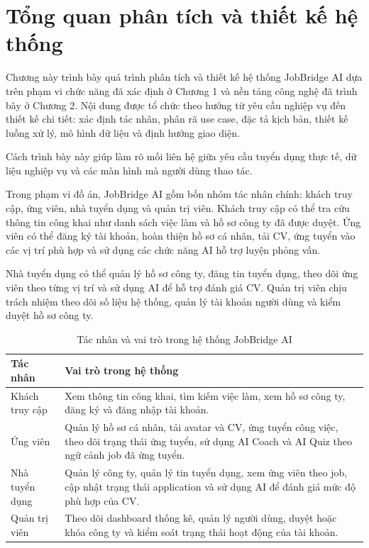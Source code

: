 \documentclass[../DoAn.tex]{subfiles}
\begin{document}
\label{chapter:3}

\section{Tổng quan phân tích và thiết kế hệ thống}

Chương này trình bày quá trình phân tích và thiết kế hệ thống JobBridge AI dựa trên phạm vi chức năng đã xác định ở Chương 1 và nền tảng công nghệ đã trình bày ở Chương 2. Nội dung được tổ chức theo hướng từ yêu cầu nghiệp vụ đến thiết kế chi tiết: xác định tác nhân, phân rã use case, đặc tả kịch bản, thiết kế luồng xử lý, mô hình dữ liệu và định hướng giao diện.

Cách trình bày này giúp làm rõ mối liên hệ giữa yêu cầu tuyển dụng thực tế, dữ liệu nghiệp vụ và các màn hình mà người dùng thao tác.

Trong phạm vi đồ án, JobBridge AI gồm bốn nhóm tác nhân chính: khách truy cập, ứng viên, nhà tuyển dụng và quản trị viên. Khách truy cập có thể tra cứu thông tin công khai như danh sách việc làm và hồ sơ công ty đã được duyệt. Ứng viên có thể đăng ký tài khoản, hoàn thiện hồ sơ cá nhân, tải CV, ứng tuyển vào các vị trí phù hợp và sử dụng các chức năng AI hỗ trợ luyện phỏng vấn.

Nhà tuyển dụng có thể quản lý hồ sơ công ty, đăng tin tuyển dụng, theo dõi ứng viên theo từng vị trí và sử dụng AI để hỗ trợ đánh giá CV. Quản trị viên chịu trách nhiệm theo dõi số liệu hệ thống, quản lý tài khoản người dùng và kiểm duyệt hồ sơ công ty.

\begin{table}[H]
    \centering
    \renewcommand{\arraystretch}{1.25}
    \begin{tabular}{|l|p{}|}
        \hline
        \textbf{Tác nhân} & \textbf{Vai trò trong hệ thống} \\
        \hline
        Khách truy cập & Xem thông tin công khai, tìm kiếm việc làm, xem hồ sơ công ty, đăng ký và đăng nhập tài khoản. \\
        \hline
        Ứng viên & Quản lý hồ sơ cá nhân, tải avatar và CV, ứng tuyển công việc, theo dõi trạng thái ứng tuyển, sử dụng AI Coach và AI Quiz theo ngữ cảnh job đã ứng tuyển. \\
        \hline
        Nhà tuyển dụng & Quản lý công ty, quản lý tin tuyển dụng, xem ứng viên theo job, cập nhật trạng thái application và sử dụng AI để đánh giá mức độ phù hợp của CV. \\
        \hline
        Quản trị viên & Theo dõi dashboard thống kê, quản lý người dùng, duyệt hoặc khóa công ty và kiểm soát trạng thái hoạt động của tài khoản. \\
        \hline
    \end{tabular}
    \caption{Tác nhân và vai trò trong hệ thống JobBridge AI}
    \label{tab:actors-roles}
\end{table}
\end{document}
